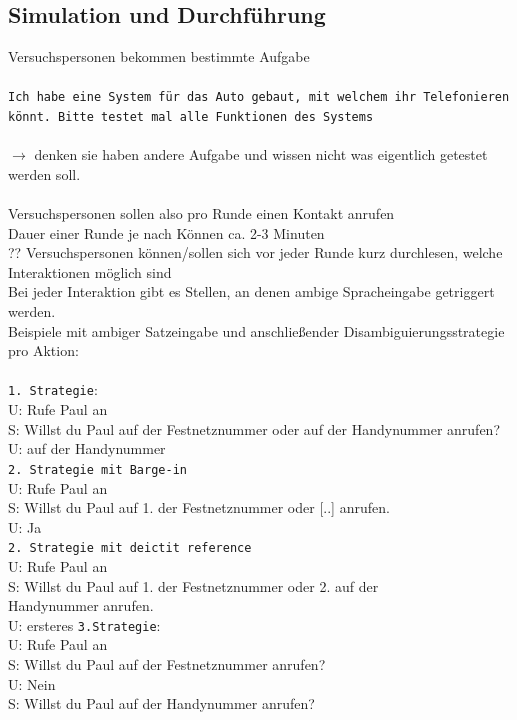 \documentclass[12pt,a4paper]{scrartcl}
\begin{document}
\subsection{Simulation und Durchführung}
Versuchspersonen bekommen bestimmte Aufgabe\\
\\
\texttt{Ich habe eine System für das Auto gebaut, mit welchem ihr Telefonieren könnt. Bitte testet mal alle Funktionen des Systems}\\
\\
$\rightarrow$ denken sie haben andere Aufgabe und wissen nicht was eigentlich getestet werden soll.\\
\\
Versuchspersonen sollen also pro Runde einen Kontakt anrufen\\
Dauer einer Runde je nach Können ca. 2-3 Minuten\\
?? Versuchspersonen können/sollen sich vor jeder Runde kurz durchlesen, welche Interaktionen möglich sind\\
Bei jeder Interaktion gibt es Stellen, an denen ambige Spracheingabe getriggert werden.
\\
Beispiele mit ambiger Satzeingabe und anschließender Disambiguierungsstrategie pro Aktion:
\\
\\
\texttt{1. Strategie}:\\
U: Rufe Paul an\\
S: Willst du Paul auf der Festnetznummer oder auf der Handynummer anrufen?\\
U: auf der Handynummer\\
\texttt{2. Strategie mit Barge-in}\\
U: Rufe Paul an\\
S: Willst du Paul auf 1. der Festnetznummer oder [..]  anrufen.\\
U: Ja\\
\texttt{2. Strategie mit deictit reference}\\
U: Rufe Paul an\\
S: Willst du Paul auf 1. der Festnetznummer oder 2. auf der\\ Handynummer anrufen.\\
U: ersteres
\texttt{3.Strategie}:\\
U: Rufe Paul an\\
S: Willst du Paul auf der Festnetznummer anrufen?\\
U: Nein\\
S: Willst du Paul auf der Handynummer anrufen?\\
\end{document}

